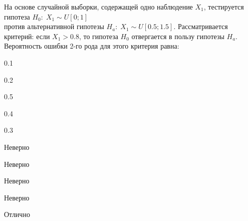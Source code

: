 
\begin{question}
На основе случайной выборки, содержащей одно наблюдение \(X_1\),
тестируется гипотеза \(H_0: \; X_1 \sim U[0;1]\)\\
против альтернативной гипотезы \(H_a: \; X_1 \sim U[0.5;1.5]\).
Рассматривается критерий: если \(X_1>0.8\), то гипотеза \(H_0\)
отвергается в пользу гипотезы \(H_a\). Вероятность ошибки 2-го рода для
этого критерия равна:
\begin{answerlist}
  \item 0.1
  \item 0.2
  \item 0.5
  \item 0.4
  \item 0.3
\end{answerlist}
\end{question}

\begin{solution}
\begin{answerlist}
  \item Неверно
  \item Неверно
  \item Неверно
  \item Неверно
  \item Отлично
\end{answerlist}
\end{solution}

